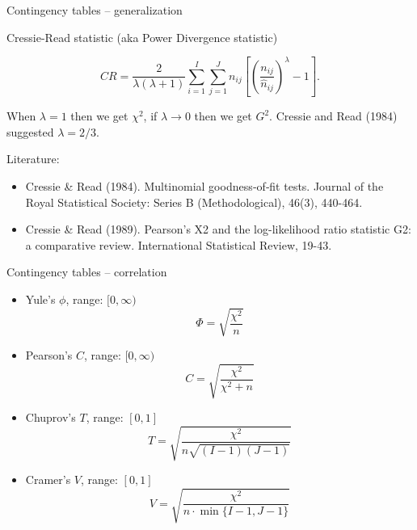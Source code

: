 \documentclass[10pt,ignorenonframetext,aspectratio=169]{beamer}
\begin{document}
\begin{frame}{Contingency tables -- generalization}

Cressie-Read statistic (aka Power Divergence statistic)

\begin{equation}
    CR=\frac{2}{\lambda(\lambda+1)} \sum_{i=1}^{I} \sum_{j=1}^{J} n_{i j}\left[\left(\frac{n_{i j}}{\hat{n}_{i j}}\right)^{\lambda}-1\right].
\end{equation}

When $\lambda=1$ then we get $\chi^2$, if $\lambda \to 0$ then we get $G^{2}$. Cressie and Read (1984) suggested $\lambda=2/3$.

\vspace{0.5cm}

Literature: 
\begin{itemize}
    \small
    \item Cressie \& Read (1984). Multinomial goodness‐of‐fit tests. Journal of the Royal Statistical Society: Series B (Methodological), 46(3), 440-464.
    \item Cressie \& Read (1989). Pearson's X2 and the log-likelihood ratio statistic G2: a comparative review. International Statistical Review, 19-43.
\end{itemize}
\end{frame}

\begin{frame}{Contingency tables -- correlation}
    \begin{itemize}
        \item Yule's $\phi$, range: $[0,\infty)$
        \begin{equation}
            \Phi=\sqrt{\frac{\chi^{2}}{n}}
        \end{equation}
        \item Pearson's $C$, range: $[0,\infty)$
        \begin{equation}
            C=\sqrt{\frac{\chi^{2}}{\chi^{2}+n}}
        \end{equation}
        \item Chuprov's $T$, range: $[0,1]$
        \begin{equation}
            T=\sqrt{\frac{\chi^{2}}{n \sqrt{(I-1)(J-1)}}}
        \end{equation}
        \item Cramer's $V$, range: $[0,1]$
        \begin{equation}
            V=\sqrt{\frac{\chi^{2}}{n \cdot \min \{I-1, J-1\}}}
        \end{equation}
    \end{itemize}
\end{frame}
\end{document}
